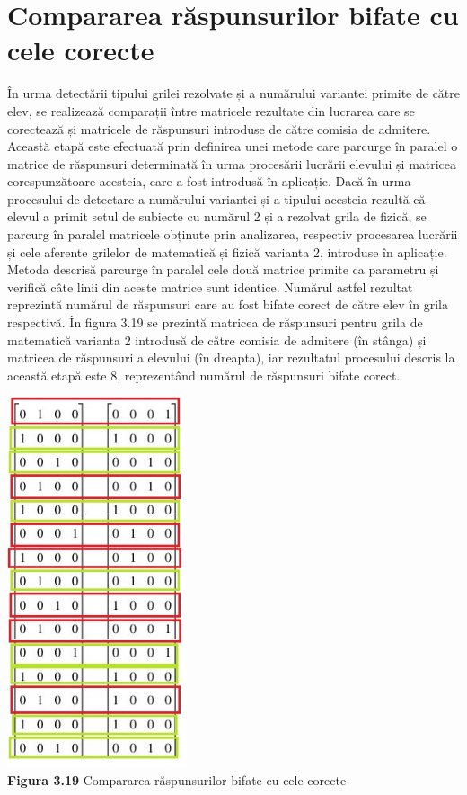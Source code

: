 \documentclass[a4paper,12pt]{report}
\newcommand\tab[1][1cm]{\hspace*{#1}}
\begin{document}
\section{Compararea răspunsurilor bifate cu cele corecte}
\tab În urma detectării tipului grilei rezolvate și a numărului variantei primite de către elev, se realizează comparații între matricele rezultate din lucrarea care se corectează și matricele de răspunsuri introduse de către comisia de admitere. Această etapă este efectuată prin definirea unei metode care parcurge în paralel o matrice de răspunsuri determinată în urma procesării lucrării elevului și matricea corespunzătoare acesteia, care a fost introdusă în aplicație. Dacă în urma procesului de detectare a numărului variantei și a tipului acesteia rezultă că elevul a primit setul de subiecte cu numărul 2 și a rezolvat grila de fizică, se parcurg în paralel matricele obținute prin analizarea, respectiv procesarea lucrării și cele aferente grilelor de matematică și fizică varianta 2, introduse în aplicație.
\\ \tab Metoda descrisă parcurge în paralel cele două matrice primite ca parametru și verifică câte linii din aceste matrice sunt identice. Numărul astfel rezultat reprezintă numărul de răspunsuri care au fost bifate corect de către elev în grila respectivă. În figura 3.19 se prezintă matricea de răspunsuri pentru grila de matematică varianta 2 introdusă de către comisia de admitere (în stânga) și matricea de răspunsuri a elevului (în dreapta), iar rezultatul procesului descris la această etapă este 8, reprezentând numărul de răspunsuri bifate corect.
\begin {center} 
	\begin {footnotesize} 
		\includegraphics[width = 53mm]{fig3_19} \\
		\textbf  {Figura 3.19} Compararea răspunsurilor bifate cu cele corecte
	\end {footnotesize} 
\end {center}
\end{document}
